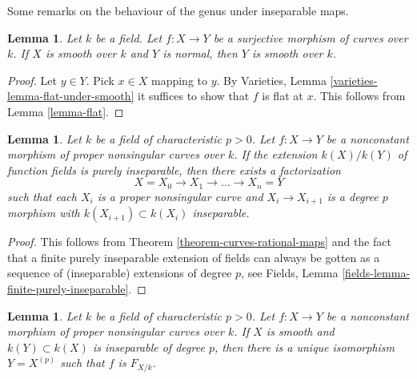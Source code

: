 \documentclass{stacks-project}
\theoremstyle{plain}
\newtheorem{lemma}[subsection]{Lemma}
\theoremstyle{definition}
\theoremstyle{remark}
\numberwithin{equation}{subsection}
\begin{document}
\noindent
Some remarks on the behaviour of the genus under inseparable maps.

\begin{lemma}
\label{lemma-dominated-by-smooth}
Let $k$ be a field. Let $f : X \to Y$ be a surjective morphism
of curves over $k$. If $X$ is smooth over $k$ and
$Y$ is normal, then $Y$ is smooth over $k$.
\end{lemma}

\begin{proof}
Let $y \in Y$. Pick $x \in X$ mapping to $y$.
By Varieties, Lemma \ref{varieties-lemma-flat-under-smooth}
it suffices to show that $f$ is flat at $x$.
This follows from Lemma \ref{lemma-flat}.
\end{proof}

\begin{lemma}
\label{lemma-purely-inseparable}
Let $k$ be a field of characteristic $p > 0$. Let $f : X \to Y$ be a
nonconstant morphism of proper nonsingular curves over $k$.
If the extension $k(X)/k(Y)$ of function fields
is purely inseparable, then there exists a factorization
$$
X = X_0 \to X_1 \to \ldots \to X_n = Y
$$
such that each $X_i$ is a proper nonsingular curve
and $X_i \to X_{i + 1}$ is a degree $p$
morphism with $k(X_{i + 1}) \subset k(X_i)$
inseparable.
\end{lemma}

\begin{proof}
This follows from Theorem \ref{theorem-curves-rational-maps}
and the fact that a finite purely inseparable extension of fields
can always be gotten as a sequence of (inseparable) extensions of degree $p$,
see Fields, Lemma \ref{fields-lemma-finite-purely-inseparable}.
\end{proof}

\begin{lemma}
\label{lemma-inseparable-deg-p-smooth}
Let $k$ be a field of characteristic $p > 0$. Let $f : X \to Y$ be a
nonconstant morphism of proper nonsingular curves over $k$.
If $X$ is smooth and $k(Y) \subset k(X)$ is inseparable of degree $p$,
then there is a unique isomorphism $Y = X^{(p)}$ such that
$f$ is $F_{X/k}$.
\end{lemma}
\end{document}
